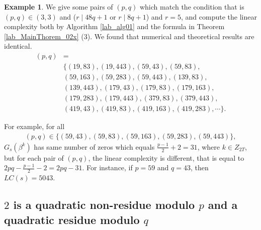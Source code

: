\documentclass{mcom-l}
\theoremstyle{definition}
\newtheorem{sec3Bexp1}[sec3exp1]{Example}
\numberwithin{equation}{section}
\begin{document}
   \begin{sec3Bexp1}\label{lab_sec3Bexp1}
   We give some pairs of $ (p,q) $ which match the condition that is $ (p,q)\in (3, 3) $ and ($ r\mid 48q+1 $ or $ r\mid 8q+1 $) and $ r=5 $, and compute the linear complexity both by Algorithm \ref{lab_alg01} and the formula in Theorem \ref{lab_MainThorem_02x} (3). We found that numerical and theoretical results are identical.
   \begin{equation*}
   \begin{split}
   (p,q)&=\\
   &\lbrace (19, 83), (19, 443), (59, 43), (59, 83),\\
   &(59, 163), (59, 283), (59, 443), (139, 83),\\
   &(139,443),(179,43),(179,83),(179,163),\\
   &(179,283),(179,443),(379,83),(379,443),\\
   &(419, 43), (419, 83), (419, 163), (419, 283),\cdots\rbrace.
   \end{split}
   \end{equation*}
   \end{sec3Bexp1}
    For example, for all 
    \begin{equation*}
    \begin{split}
    (p,q)\in \lbrace (59, 43), (59, 83),(59, 163), (59, 283), (59, 443) \rbrace,
    \end{split}
    \end{equation*}
     $ G_{s}(\beta^{k}) $ has same number of zeros which equals $ \tfrac{p-1}{2}+2=31 $, where $ k\in Z_{2T} $, but for each pair of $ (p,q) $, the linear complexity is different, that is equal to $ 2pq- \tfrac{p-1}{2}-2=2pq-31 $. For instance, if $ p=59 $ and $ q=43 $, then $ LC(s) =5043$.
    \subsection{$ 2 $ is a quadratic non-residue  modulo $ p $ and a quadratic residue modulo $ q $}
    
\end{document}
